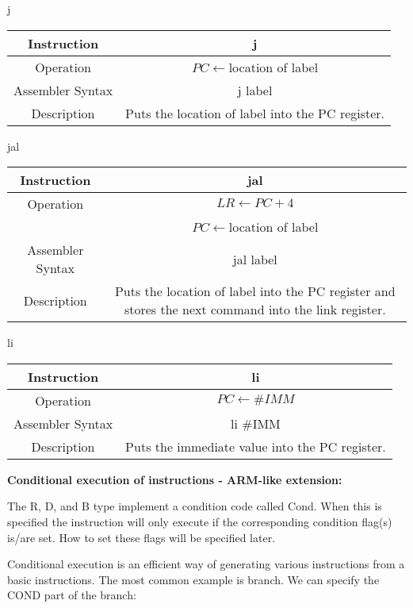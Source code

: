 \documentclass[]{article}
\begin{document}
j\\
\begin{tabular}{c|c}\hline
	Instruction & j\\\hline
	Operation & $PC \leftarrow $location of label\\\hline
	Assembler Syntax & j label\\\hline
	Description & Puts the location of label into the PC register.\\\hline
\end{tabular}\vspace{1.5cm}

jal\\
\begin{tabular}{c|c}\hline
	Instruction & jal\\\hline
	Operation & $LR \leftarrow PC + 4$\\&$PC \leftarrow $location of label\\\hline
	Assembler Syntax & jal label\\\hline
	Description & Puts the location of label into the PC register and stores the next command into the link register.\\\hline
\end{tabular}\vspace{1.5cm}

li\\
\begin{tabular}{c|c}\hline
	Instruction & li\\\hline
	Operation & $PC \leftarrow \#IMM$\\\hline
	Assembler Syntax & li \#IMM\\\hline
	Description & Puts the immediate value into the PC register.\\\hline
\end{tabular}\vspace{1.5cm}



\pagebreak

{\Large
	\textbf{
		Conditional execution of instructions - ARM-like extension:
	}
}

\noindent The R, D, and B type implement a condition code called Cond.  When this is specified the instruction will only execute if the corresponding condition flag(s) is/are set.  How to set these flags will be specified later.

\noindent Conditional execution is an efficient way of generating various instructions from a basic instructions.  The most common example is branch.  We can specify the COND part of the branch:
\end{document}
